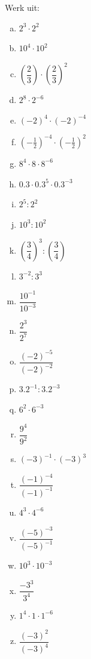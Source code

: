 \documentclass[12pt,twoside]{article}
\begin{document}
\begin{oefening}
Werk uit:
\begin{multicols}{4}
  \begin{enumerate}[(a)]
    \itemsep1em
    \item $2^3\cdot 2^2$
    \item $10^4\cdot 10^2$
    \item $\left(\dfrac{2}{3}\right)\cdot \left(\dfrac{2}{3}\right)^2$
    \item $2^8\cdot 2^{-6}$
    \item $\left(-2\right)^4\cdot \left(-2\right)^{-4}$
    \item $\left(-\frac{1}{2}\right)^{-4}\cdot \left(-\frac{1}{2}\right)^2$
    \item $8^4\cdot 8\cdot 8^{-6}$
    \item $0.3\cdot 0.3^5\cdot 0.3^{-3}$
    \item $2^5: 2^2$
    \item $10^3: 10^2$
    \item $\left(\dfrac{3}{4}\right)^3: \left(\dfrac{3}{4}\right)$
    \item $3^{-2}: 3^3$
    \item $\dfrac{10^{-1}}{10^{-3}}$
    \item $\dfrac{2^{3}}{2^{7}}$
    \item $\dfrac{(-2)^{-5}}{(-2)^{-2}}$
    \item $3.2^{-1}:3.2^{-3}$
    \item $6^2\cdot 6^{-3}$
    \item $\dfrac{9^4}{9^2}$
    \item $\left(-3\right)^{-1}\cdot \left(-3\right)^3$
    \item $\dfrac{\left(-1\right)^{-4}}{\left(-1\right)^{-1}}$
    \item $4^3\cdot 4^{-6}$
    \item $\dfrac{\left(-5\right)^{-3}}{\left(-5\right)^{-1}}$
    \item $10^3\cdot 10^{-3}$
    \item $\dfrac{-3^3}{3^4}$
    \item $1^4\cdot1\cdot1^{-6}$
    \item $\dfrac{\left(-3\right)^{2}}{\left(-3\right)^{4}}$
  \end{enumerate}
\end{multicols}
\end{oefening}
\end{document}

